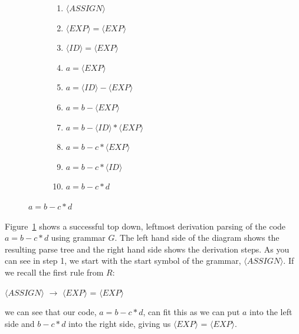 \documentclass[ %
                    author={Jonathan Rankin},
                supervisor={Dr. David May, Dr. Ian Holyer},
                    degree={MEng},
                     title={CodeTouch},
                  subtitle={A Revolutionary Way To Program Real Code On Touch Screen Devices},
                      type={enterprise},
                      year={2015 } ]{dissertation}
\begin{document}
\begin{itemize}
\begin{figure}[h]
\begin{subfigure}{0.7\textwidth}
\end{subfigure}%
\begin{subfigure}{0.7\textwidth}
  \centering
        \begin{enumerate}
          \item $\langle ASSIGN \rangle    $\\      
            \item $\langle EXP \rangle = \langle EXP \rangle $\\
            \item $\langle ID \rangle = \langle EXP \rangle$ \\
            \item $a = \langle EXP \rangle $\\
            \item $a = \langle ID \rangle - \langle EXP \rangle $\\
            \item $a = b - \langle EXP \rangle $\\
            \item $a = b - \langle ID \rangle * \langle EXP \rangle $\\
            \item $a = b - c * \langle EXP \rangle $\\
            \item $a = b - c * \langle ID \rangle $\\
            \item $a = b - c * d $\\
        \end{enumerate}

\end{subfigure}
\caption{$a = b - c * d$}
\label{fig:success}
\end{figure}

Figure~\ref{fig:success} shows a successful top down, leftmost derivation parsing of the code $a = b - c * d$ using grammar $G$. The left hand side of the diagram shows the resulting parse tree and the right hand side shows the derivation steps. As you can see in step 1, we start with the start symbol of the grammar, $\langle ASSIGN \rangle$. If we recall the first rule from $R$:

\begin{center}
$\langle ASSIGN \rangle$ $\rightarrow$ $\langle EXP \rangle$ = $\langle EXP \rangle$
\end{center}
we can see that our code, $a = b - c * d$, can fit this as we can put $a$ into the left side and $b - c * d$ into the right side, giving us
$\langle EXP \rangle$ = $\langle EXP \rangle$.


\end{itemize}
\end{document}

